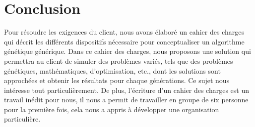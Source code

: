 \documentclass[a4paper,11pt]{article}
\begin{document}
	\section*{Conclusion}
		Pour résoudre les exigences du client, nous avons élaboré un cahier des charges qui décrit les différents dispositifs nécessaire pour conceptualiser un algorithme génétique générique. Dans ce cahier des charges, nous proposons une solution qui permettra au client de simuler des problèmes variés, tels que des problèmes génétiques, mathématiques, d’optimisation, etc., dont les solutions sont approchées et obtenir les résultats pour chaque générations. 
	Ce sujet nous intéresse tout particulièrement. De plus, l’écriture d’un cahier des charges est un travail inédit pour nous, il nous a permit de travailler en groupe de six personne pour la première fois, cela nous a appris à développer une organisation particulière.
\end{document}
